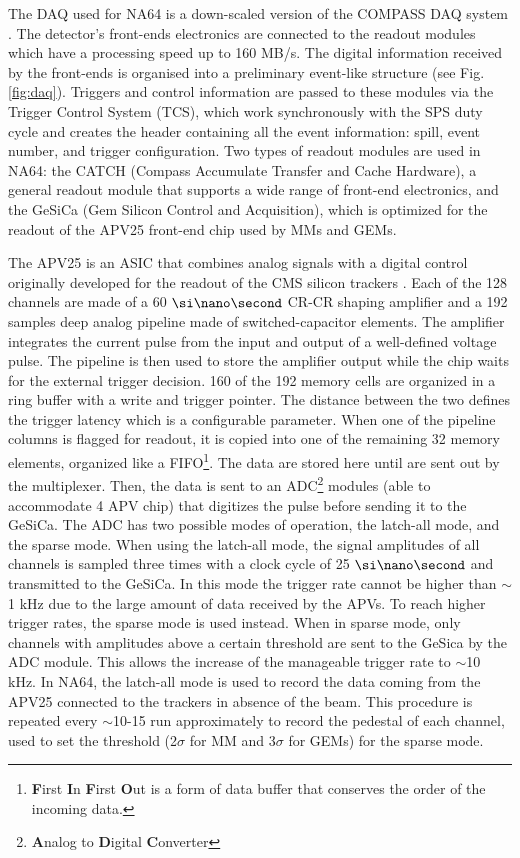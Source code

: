 The DAQ used for NA64 is a down-scaled version of the COMPASS DAQ system \cite{Bodlak_2013,COMPASS-daq}. The detector's front-ends electronics are connected to the readout modules which have a processing speed up to 160 MB/s. The digital information received by the front-ends is organised into a preliminary event-like structure (see Fig.\ref{fig:daq}). Triggers and control information are passed to these modules via the Trigger Control System (TCS), which work synchronously with the SPS duty cycle and creates the header containing all the event information: spill, event number, and trigger configuration. Two types of readout modules are used in NA64: the CATCH (Compass Accumulate Transfer and Cache Hardware), a general readout module that supports a wide range of front-end electronics, and the GeSiCa (Gem Silicon Control and Acquisition), which is optimized for the readout of the APV25 front-end chip used by MMs and GEMs.

The APV25 is an ASIC that combines analog signals with a digital control \cite{Bodlak_2013} originally developed for the readout of the CMS silicon trackers \cite{article,inproceedings,apv-useguide}. Each of the 128 channels are made of a 60 $\nas$ CR-CR shaping amplifier and a 192 samples deep analog pipeline made of switched-capacitor elements. The amplifier integrates the current pulse from the input and output of a well-defined voltage pulse. The pipeline is then used to store the amplifier output while the chip waits for the external trigger decision. 160 of the 192 memory cells are organized in a ring buffer with a write and trigger pointer. The distance between the two defines the trigger latency which is a configurable parameter. When one of the pipeline columns is flagged for readout, it is copied into one of the remaining 32 memory elements, organized like a FIFO\footnote{\textbf{F}irst \textbf{I}n \textbf{F}irst \textbf{O}ut is a form of data buffer that conserves the order of the incoming data.}. The data are stored here until are sent out by the multiplexer. Then, the data is sent to an ADC\footnote{\textbf{A}nalog to \textbf{D}igital \textbf{C}onverter} modules (able to accommodate 4 APV chip) that digitizes the pulse before sending it to the GeSiCa. The ADC has two possible modes of operation, the latch-all mode, and the sparse mode. When using the latch-all mode, the signal amplitudes of all channels is sampled three times with a clock cycle of 25 $\nas$ and transmitted to the GeSiCa. In this mode the trigger rate cannot be higher than $\sim$1 \si{\kilo\hertz} due to the large amount of data received by the APVs. To reach higher trigger rates, the sparse mode is used instead. When in sparse mode, only channels with amplitudes above a certain threshold are sent to the GeSica by the ADC module. This allows the increase of the manageable trigger rate to $\sim$10 \si{\kilo\hertz}. In NA64, the latch-all mode is used to record the data coming from the APV25 connected to the trackers in absence of the beam. This procedure is repeated every $\sim$10-15 run approximately to record the pedestal of each channel, used to set the threshold (2$\sigma$ for MM and 3$\sigma$ for GEMs) for the sparse mode.

